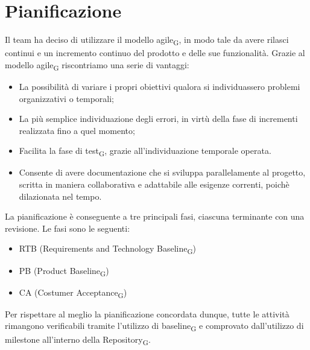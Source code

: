 \documentclass{article}
\begin{document}
\section{Pianificazione}
Il team ha deciso di utilizzare il modello agile\textsubscript{G}, in modo tale da avere rilasci continui e un incremento continuo del prodotto e delle sue funzionalità. Grazie al modello agile\textsubscript{G} riscontriamo una serie di vantaggi:
\begin{itemize}
    \item La possibilità di variare i propri obiettivi qualora si individuassero problemi organizzativi o temporali;
    \item La più semplice individuazione degli errori, in virtù della fase di incrementi realizzata fino a quel momento;
    \item Facilita la fase di test\textsubscript{G}, grazie all’individuazione temporale operata.
    \item Consente di avere documentazione che si sviluppa parallelamente al progetto, scritta in maniera collaborativa e adattabile alle esigenze correnti, poichè dilazionata nel tempo.
\end{itemize}

La pianificazione è conseguente a tre principali fasi, ciascuna terminante con una revisione. Le fasi sono le seguenti:
\begin{itemize}
    \item RTB (Requirements and Technology Baseline\textsubscript{G})
    \item PB (Product Baseline\textsubscript{G})
    \item CA (Costumer Acceptance\textsubscript{G})
\end{itemize}
Per rispettare al meglio la pianificazione concordata dunque, tutte le  attività rimangono verificabili tramite l’utilizzo di baseline\textsubscript{G} e comprovato dall’utilizzo di milestone all'interno della Repository\textsubscript{G}.
\end{document}
